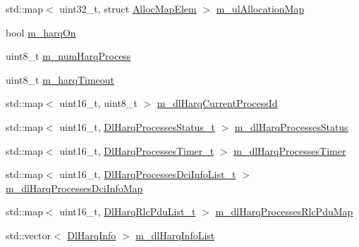 \begin{DoxyCompactItemize}
\item 
std\+::map$<$ uint32\+\_\+t, struct \hyperlink{structns3_1_1MmWaveFlexTtiMaxWeightMacScheduler_1_1AllocMapElem}{Alloc\+Map\+Elem} $>$ \hyperlink{classns3_1_1MmWaveFlexTtiMaxWeightMacScheduler_ac8ae3992d5f26804eff2d4cab3309777}{m\+\_\+ul\+Allocation\+Map}
\item 
bool \hyperlink{classns3_1_1MmWaveFlexTtiMaxWeightMacScheduler_af63eec946bdf0fb2db0c66104e95f1a6}{m\+\_\+harq\+On}
\item 
uint8\+\_\+t \hyperlink{classns3_1_1MmWaveFlexTtiMaxWeightMacScheduler_af9d5054accfd2ee1f58025c5fa6c2215}{m\+\_\+num\+Harq\+Process}
\item 
uint8\+\_\+t \hyperlink{classns3_1_1MmWaveFlexTtiMaxWeightMacScheduler_a02b270d8521c36d4585207caa62e78ee}{m\+\_\+harq\+Timeout}
\item 
std\+::map$<$ uint16\+\_\+t, uint8\+\_\+t $>$ \hyperlink{classns3_1_1MmWaveFlexTtiMaxWeightMacScheduler_a3c97cb454f3043b77f1f991c940ef573}{m\+\_\+dl\+Harq\+Current\+Process\+Id}
\item 
std\+::map$<$ uint16\+\_\+t, \hyperlink{classns3_1_1MmWaveFlexTtiMaxWeightMacScheduler_af2731adf8f78ed39f5decc7169a69929}{Dl\+Harq\+Processes\+Status\+\_\+t} $>$ \hyperlink{classns3_1_1MmWaveFlexTtiMaxWeightMacScheduler_a798ed476b56504b548455147167df24b}{m\+\_\+dl\+Harq\+Processes\+Status}
\item 
std\+::map$<$ uint16\+\_\+t, \hyperlink{classns3_1_1MmWaveFlexTtiMaxWeightMacScheduler_a386e3c0ef3c5c41fa7d18d32d2f1ff70}{Dl\+Harq\+Processes\+Timer\+\_\+t} $>$ \hyperlink{classns3_1_1MmWaveFlexTtiMaxWeightMacScheduler_a60826192a5d859c1a1bb20955b3ad981}{m\+\_\+dl\+Harq\+Processes\+Timer}
\item 
std\+::map$<$ uint16\+\_\+t, \hyperlink{classns3_1_1MmWaveFlexTtiMaxWeightMacScheduler_abe8aaff4b87b3b6639537eb26040a203}{Dl\+Harq\+Processes\+Dci\+Info\+List\+\_\+t} $>$ \hyperlink{classns3_1_1MmWaveFlexTtiMaxWeightMacScheduler_ac833e86e5419d19a445f1e359d06486e}{m\+\_\+dl\+Harq\+Processes\+Dci\+Info\+Map}
\item 
std\+::map$<$ uint16\+\_\+t, \hyperlink{classns3_1_1MmWaveFlexTtiMaxWeightMacScheduler_aa4a468c3b36804769d0e97d48d0658b5}{Dl\+Harq\+Rlc\+Pdu\+List\+\_\+t} $>$ \hyperlink{classns3_1_1MmWaveFlexTtiMaxWeightMacScheduler_aa9cdf43f057d1bd8e1cfcf2a21ea89f0}{m\+\_\+dl\+Harq\+Processes\+Rlc\+Pdu\+Map}
\item 
std\+::vector$<$ \hyperlink{structns3_1_1DlHarqInfo}{Dl\+Harq\+Info} $>$ \hyperlink{classns3_1_1MmWaveFlexTtiMaxWeightMacScheduler_afcc7ec068937dbf27338c5ed6a7a2f77}{m\+\_\+dl\+Harq\+Info\+List}

\end{DoxyCompactItemize}
